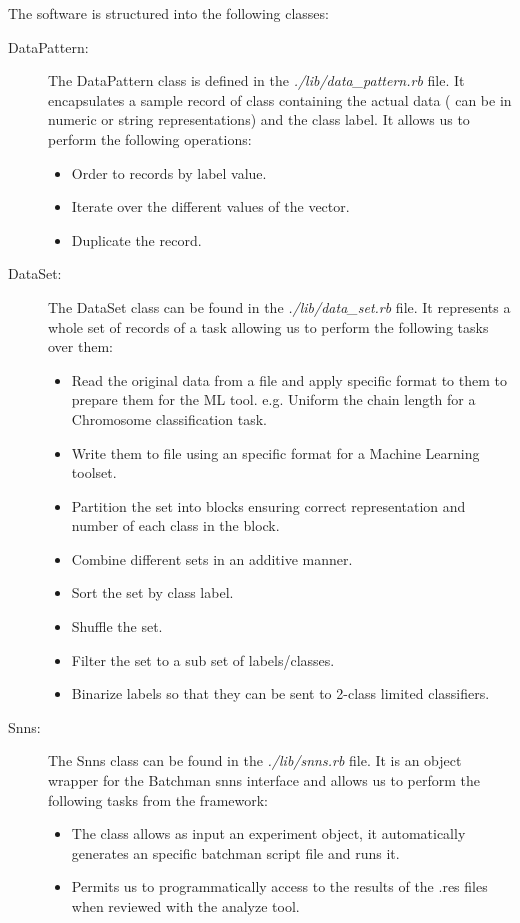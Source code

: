 \documentclass[a4paper,10pt,titlepage]{article}
\begin{document}
\par The software is structured into the following classes:
\begin{description}
	\item[DataPattern:] The DataPattern class is defined in the \textit{./lib/data\_pattern.rb} file. It encapsulates a sample record of class containing the actual data ( can be in numeric or string representations) and the class label. It allows us to perform the following operations: 
	\begin{itemize}
		\item Order to records by label value.
		\item Iterate over the different values of the vector.
		\item Duplicate the record.
	\end{itemize}
	\item[DataSet:] The DataSet class can be found in the \textit{./lib/data\_set.rb} file. It represents a whole set of records of a task allowing us to perform the following tasks over them:
	\begin{itemize}
		\item Read the original data from a file and apply specific format to them to prepare them for the ML tool. e.g. Uniform the chain length for a Chromosome classification task. 
		\item Write them to file using an specific format for a Machine Learning toolset.
		\item Partition the set into blocks ensuring correct representation and number of each class in the block.
		\item Combine different sets in an additive manner.
		\item Sort the set by class label.
		\item Shuffle the set.
		\item Filter the set to a sub set of labels/classes.
		\item Binarize labels so that they can be sent to 2-class limited classifiers. 
	\end{itemize}
	\item[Snns:] The Snns class can be found in the \textit{./lib/snns.rb} file. It is an object wrapper for the Batchman snns interface and allows us to perform the following tasks from the framework:
	\begin{itemize}
		\item The class allows as input an experiment object, it automatically generates an specific batchman script file and runs it. 
		\item Permits us to programmatically access to the results of the .res files when reviewed with the analyze tool.

\end{itemize}
\end{description}
\end{document}
